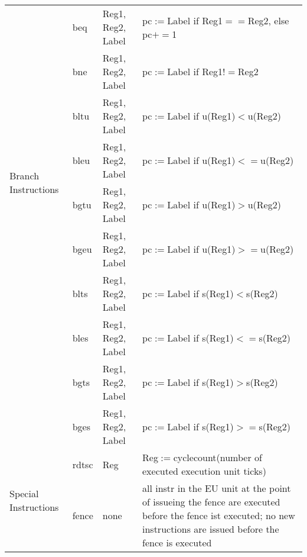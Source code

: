 \documentclass{article}
\begin{document}
{\begin{tabular}{ |p{2cm}||p{2cm}|p{3cm}|p{5cm}|  }
 \hline
  \multirow{8}{2cm}{Branch Instructions} & beq &Reg1, Reg2, Label& pc$:=$Label if Reg1$==$Reg2, else pc$+=$1\\
&bne& Reg1, Reg2, Label&pc$:=$Label if Reg1$!=$Reg2\\
&bltu& Reg1, Reg2, Label&  pc$:=$Label if u(Reg1)$<$u(Reg2)\\
&bleu& Reg1, Reg2, Label&  pc$:=$Label if u(Reg1)$<=$u(Reg2)\\
&bgtu  & Reg1, Reg2, Label&pc$:=$Label if u(Reg1)$>$u(Reg2)\\
&bgeu& Reg1, Reg2, Label&pc$:=$Label if u(Reg1)$>=$u(Reg2)\\
&blts& Reg1, Reg2, Label&pc$:=$Label if s(Reg1)$<$s(Reg2)\\
&bles& Reg1, Reg2, Label&pc$:=$Label if s(Reg1)$<=$s(Reg2)\\
&bgts& Reg1, Reg2, Label&pc$:=$Label if s(Reg1)$>$s(Reg2)\\
&bges& Reg1, Reg2, Label&pc$:=$Label if s(Reg1)$>=$s(Reg2)\\
 \hline
   \multirow{2}{2cm}{Special Instructions} & rdtsc &Reg& Reg$:=$cyclecount(number of executed execution unit ticks)\\
&fence&none&all instr in the EU unit at the point of issueing the fence are executed before the fence ist executed; no new instructions are issued before the fence is executed\\
 \hline
\end{tabular}
}
\end{document}
